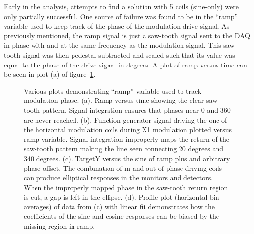 Early in the analysis, attempts to find a solution with 5 coils (sine-only) were only partially successful. One source of failure was found to be in the ``ramp'' variable used to keep track of the phase of the modulation drive signal. As previously mentioned, the ramp signal is just a saw-tooth signal sent to the DAQ in phase with and at the same frequency as the modulation signal. This saw-tooth signal was then pedestal subtracted and scaled such that its value was equal to the phase of the drive signal in degrees. A plot of ramp versus time can be seen in plot (a) of figure~\ref{fig:ramp_plots}. 
\begin{figure}[ht]

\centering
{}
\caption{Various plots demonstrating ``ramp'' variable used to track modulation phase. (a). Ramp versus time showing the clear saw-tooth pattern. Signal integration ensures that phases near 0 and 360 are never reached. (b). Function generator signal driving the one of the horizontal modulation coils during X1 modulation plotted versus ramp variable. Signal integration improperly maps the return of the saw-tooth pattern making the line seen connecting 20 degrees and 340 degrees. (c). TargetY versus the sine of ramp plus and arbitrary phase offset. The combination of in and out-of-phase driving coils can produce elliptical responses in the monitors and detectors. When the improperly mapped phase in the saw-tooth return region is cut, a gap is left in the ellipse. (d). Profile plot (horizontal bin averages) of data from (c) with linear fit demonstrates how the coefficients of the sine and cosine responses can be biased by the missing region in ramp.}
\label{fig:ramp_plots}
\end{figure}
